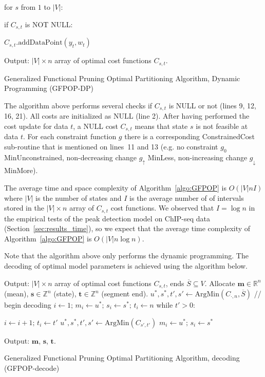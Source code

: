 \documentclass[article]{jss}
\newcommand{\ZZ}{\mathbb Z}
\newcommand{\RR}{\mathbb R}
\begin{document}
\begin{algorithm}[H]
\begin{algorithmic}[1]
\begin{ALC@g}
\begin{ALC@g}
\begin{ALC@g}
    \end{ALC@g}
    \STATE for $s$ from $1$ to $|V|$:
    \begin{ALC@g}
      \STATE if $C_{s,t}$ is NOT NULL:
      \begin{ALC@g}
        \STATE $C_{s,t}\text{.addDataPoint}(y_t, w_t)$
      \end{ALC@g}
    \end{ALC@g}
  \end{ALC@g}
\end{ALC@g}
\STATE Output: $|V|\times n$ array of optimal cost functions $C_{s,t}$.
\caption{\label{algo:GFPOP}Generalized Functional Pruning Optimal
  Partitioning Algorithm, Dynamic Programming (GFPOP-DP)}
\end{algorithmic}
\end{algorithm}

The algorithm above performs several checks if $C_{s,t}$ is NULL or
not (lines 9, 12, 16, 21). All costs are initialized as NULL (line
2). After having performed the cost update for data $t$, a NULL cost
$C_{s,t}$ means that state $s$ is not feasible at data $t$. For each
constraint function $g$ there is a corresponding ConstrainedCost
sub-routine that is mentioned on lines~11 and 13 (e.g. no constraint
$g_0$ MinUnconstrained, non-decreasing change $g_\uparrow$ MinLess,
non-increasing change $g_\downarrow$ MinMore). 

The average time and space complexity of Algorithm~\ref{algo:GFPOP} is
$O(|V| n I)$ where $|V|$ is the number of states and $I$ is the
average number of of intervals stored in the $|V|\times n$ array of
$C_{s,t}$ cost functions. We observed that $I=\log n$ in the empirical
tests of the peak detection model on ChIP-seq data
(Section~\ref{sec:results_time}), so we expect that the average time
complexity of Algorithm~\ref{algo:GFPOP} is $O(|V| n\log n)$.

Note that the algorithm above only performs the dynamic
programming. The decoding of optimal model parameters is achieved
using the algorithm below.

\begin{algorithm}[H]
\begin{algorithmic}[1]
\STATE Output: $|V|\times n$ array of optimal cost functions $C_{s,t}$, 
ends $\overline S\subseteq V$.
\STATE Allocate
$\mathbf m\in\RR^n$ (mean), 
$\mathbf s\in\ZZ^n$ (state), 
$\mathbf t\in\ZZ^n$ (segment end).
\STATE $u^*,s^*,t',s'\gets \text{ArgMin}(C_{\cdot,n}, \overline S)$ // begin decoding
\STATE $i\gets 1;\, m_{i}\gets u^*;\, s_i\gets s^*;\, t_{i}\gets n$
\STATE while $t' > 0$:
\begin{ALC@g}
  \STATE $i\gets i+1;\, t_{i}\gets t'$
  \STATE $u^*,s^*,t',s'\gets \text{ArgMin}(C_{s',t'})$
  \STATE $m_{i}\gets u^*;\, s_i\gets s^*$
\end{ALC@g}
\STATE Output: 
$\mathbf m$, 
$\mathbf s$, 
$\mathbf t$.
\caption{\label{algo:GFPOP-decode}Generalized Functional Pruning Optimal
  Partitioning Algorithm, decoding (GFPOP-decode)}
\end{algorithmic}
\end{algorithm}
\end{document}
